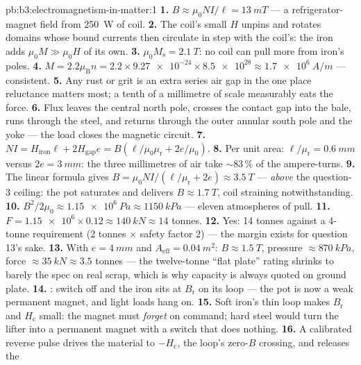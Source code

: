 \begin{solution}{pb:b3:electromagnetism-in-matter:1}
\textbf{1.} $B \approx \mu_0NI/\ell = \qty{13}{mT}$ --- a
refrigerator-magnet field from \qty{250}{W} of coil.
\textbf{2.} The coil's small $H$ unpins and rotates domains whose
bound currents then circulate in step with the coil's: the iron
adds $\mu_0M \gg \mu_0H$ of its own.
\textbf{3.} $\mu_0M_{\text{s}} = \qty{2.1}{T}$: no coil can pull
more from iron's poles.
\textbf{4.} $M = 2.2\mu_{\text{B}}n = 2.2\times\num{9.27e-24}
\times\num{8.5e28} \approx \qty{1.7e6}{A/m}$ --- consistent.
\textbf{5.} Any rust or grit is an extra series air gap in the one
place reluctance matters most; a tenth of a millimetre of scale
measurably eats the force.
\textbf{6.} Flux leaves the central north pole, crosses the
contact gap into the bale, runs through the steel, and returns
through the outer annular south pole and the yoke --- the load
closes the magnetic circuit.
\textbf{7.} $NI = H_{\text{iron}}\ell + 2H_{\text{gap}}e =
B(\ell/\mu_0\mu_{\text{r}} + 2e/\mu_0)$.
\textbf{8.} Per unit area: $\ell/\mu_{\text{r}} = \qty{0.6}{mm}$
versus $2e = \qty{3}{mm}$: the three millimetres of air take
$\sim83\,\%$ of the ampere-turns.
\textbf{9.} The linear formula gives $B = \mu_0NI/(\ell/
\mu_{\text{r}} + 2e) \approx \qty{3.5}{T}$ --- \emph{above} the
question-3 ceiling: the pot saturates and delivers $B \approx
\qty{1.7}{T}$, coil straining notwithstanding.
\textbf{10.} $B^2/2\mu_0 \approx \qty{1.15e6}{Pa} \approx
\qty{1150}{kPa}$ --- eleven atmospheres of pull.
\textbf{11.} $F = \num{1.15e6}\times0.12 \approx \qty{140}{kN}
\approx 14$ tonnes.
\textbf{12.} Yes: 14 tonnes against a 4-tonne requirement
(2 tonnes $\times$ safety factor 2) --- the margin exists for
question 13's sake.
\textbf{13.} With $e = \qty{4}{mm}$ and $A_{\text{eff}} =
\qty{0.04}{m^2}$: $B \approx \qty{1.5}{T}$, pressure
$\approx\qty{870}{kPa}$, force $\approx\qty{35}{kN} \approx 3.5$
tonnes --- the twelve-tonne ``flat plate'' rating shrinks to
barely the spec on real scrap, which is why capacity is always
quoted on ground plate.
\textbf{14.} : switch off and the iron sits at
$B_{\text{r}}$ on its loop --- the pot is now a weak permanent
magnet, and light loads hang on.
\textbf{15.} Soft iron's thin loop makes $B_{\text{r}}$ and
$H_{\text{c}}$ small: the magnet must \emph{forget} on command;
hard steel would turn the lifter into a permanent magnet with a
switch that does nothing.
\textbf{16.} A calibrated reverse pulse drives the material to
$-H_{\text{c}}$, the loop's zero-$B$ crossing, and releases the

\end{solution}
